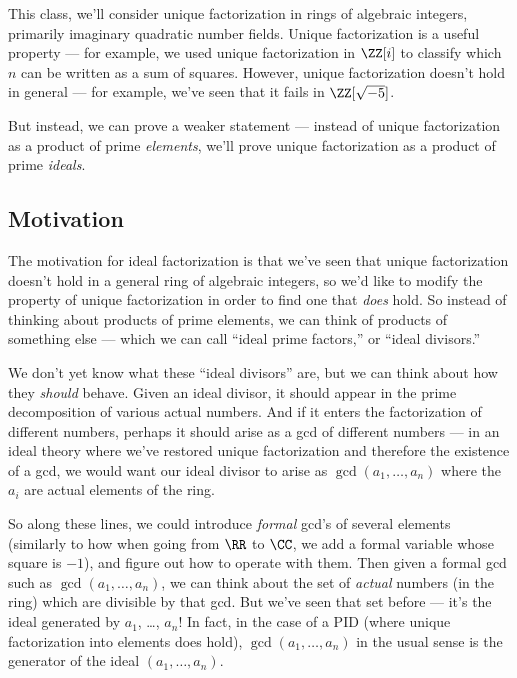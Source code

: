 This class, we'll consider unique factorization in rings of algebraic integers, primarily imaginary quadratic number fields. Unique factorization is a useful property --- for example, we used unique factorization in $\ZZ[i]$ to classify which $n$ can be written as a sum of squares. However, unique factorization doesn't hold in general --- for example, we've seen that it fails in $\ZZ[\sqrt{-5}]$. 

But instead, we can prove a weaker statement --- instead of unique factorization as a product of prime \emph{elements}, we'll prove unique factorization as a product of prime \emph{ideals}. 

\subsection{Motivation}

The motivation for ideal factorization is that we've seen that unique factorization doesn't hold in a general ring of algebraic integers, so we'd like to modify the property of unique factorization in order to find one that \emph{does} hold. So instead of thinking about products of prime elements, we can think of products of something else --- which we can call ``ideal prime factors,'' or ``ideal divisors.'' 

We don't yet know what these ``ideal divisors'' are, but we can think about how they \emph{should} behave. Given an ideal divisor, it should appear in the prime decomposition of various actual numbers. And if it enters the factorization of different numbers, perhaps it should arise as a gcd of different numbers --- in an ideal theory where we've restored unique factorization and therefore the existence of a gcd, we would want our ideal divisor to arise as $\gcd(a_1, \ldots, a_n)$ where the $a_i$ are actual elements of the ring.

So along these lines, we could introduce \emph{formal} gcd's of several elements (similarly to how when going from $\RR$ to $\CC$, we add a formal variable whose square is $-1$), and figure out how to operate with them. Then given a formal gcd such as $\gcd(a_1, \ldots, a_n)$, we can think about the set of \emph{actual} numbers (in the ring) which are divisible by that gcd. But we've seen that set before --- it's the ideal generated by $a_1$, \ldots, $a_n$! In fact, in the case of a PID (where unique factorization into elements does hold), $\gcd(a_1, \ldots, a_n)$ in the usual sense is the generator of the ideal $(a_1, \ldots, a_n)$. 


